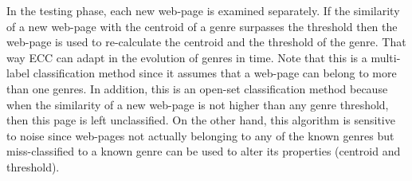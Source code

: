 \begin{itemize}
\begin{end}
In the testing phase, each new web-page is examined separately. If the similarity of a new web-page with the centroid of a genre surpasses the threshold then the web-page is used to re-calculate the centroid and the threshold of the genre. That way ECC can adapt in the evolution of genres in time. Note that this is a multi-label classification method since it assumes that a web-page can belong to more than one genres. In addition, this is an open-set classification method because when the similarity of a new web-page is not higher than any genre threshold, then this page is left unclassified. On the other hand, this algorithm is sensitive to noise since web-pages not actually belonging to any of the known genres but miss-classified to a known genre can be used to alter its properties (centroid and threshold). 







\end{end}
\end{itemize}

